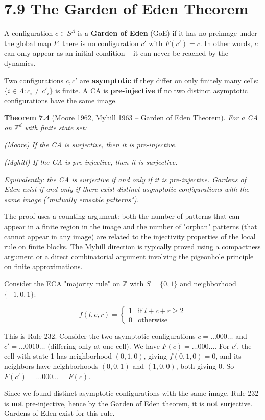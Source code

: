\section{7.9 The Garden of Eden Theorem}

A configuration $c \in S^{\Lambda}$ is a \textbf{Garden of Eden} (GoE) if it has no preimage under the global map $F$: there is no configuration $c'$ with $F(c') = c$. In other words, $c$ can only appear as an initial condition -- it can never be reached by the dynamics.

Two configurations $c, c'$ are \textbf{asymptotic} if they differ on only finitely many cells: $\{ i \in \Lambda : c_i \neq c'_i\} $ is finite. A CA is \textbf{pre-injective} if no two distinct asymptotic configurations have the same image.

\textbf{Theorem 7.4} (Moore 1962, Myhill 1963 -- Garden of Eden Theorem). \textit{For a CA on $\mathbb{Z}^d$ with finite state set:}

\textit{(Moore) If the CA is surjective, then it is pre-injective.}

\textit{(Myhill) If the CA is pre-injective, then it is surjective.}

\textit{Equivalently: the CA is surjective if and only if it is pre-injective. Gardens of Eden exist if and only if there exist distinct asymptotic configurations with the same image ("mutually erasable patterns").}

The proof uses a counting argument: both the number of patterns that can appear in a finite region in the image and the number of "orphan" patterns (that cannot appear in any image) are related to the injectivity properties of the local rule on finite blocks. The Myhill direction is typically proved using a compactness argument or a direct combinatorial argument involving the pigeonhole principle on finite approximations.

\begin{example}
Consider the ECA "majority rule" on $\mathbb{Z}$ with $S = \{ 0,1\} $ and neighborhood $\{ -1, 0, 1\} $:

\[
f(l, c, r) = \begin{cases} 1 & \text{if } l + c + r \geq 2 \\ 0 & \text{otherwise} \end{cases}
\]

This is Rule 232. Consider the two asymptotic configurations $c = \ldots 000 \ldots$ and $c' = \ldots 0010 \ldots$ (differing only at one cell). We have $F(c) = \ldots 000 \ldots$. For $c'$, the cell with state 1 has neighborhood $(0,1,0)$, giving $f(0,1,0) = 0$, and its neighbors have neighborhoods $(0,0,1)$ and $(1,0,0)$, both giving 0. So $F(c') = \ldots 000 \ldots = F(c)$.

Since we found distinct asymptotic configurations with the same image, Rule 232 is \textbf{not} pre-injective, hence by the Garden of Eden theorem, it is \textbf{not} surjective. Gardens of Eden exist for this rule.
\end{example}


